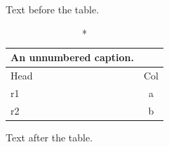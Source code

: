 \documentclass[12pt]{article}
\begin{document}
Text before the table.

\begin{longtable}{lc}
\caption*{An unnumbered caption.}\\
\hline Head & Col\\\hline
\endfirsthead
\hline
\endlastfoot
r1 & a\\
r2 & b\\
\end{longtable}

Text after the table.
\end{document}

